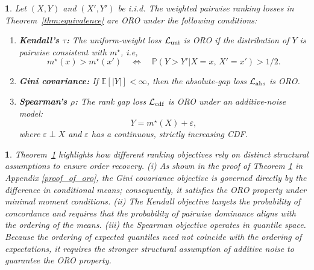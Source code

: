 \documentclass[11pt]{article}
\theoremstyle{plain}
\newtheorem{remark}{\protect\remarkname}
\theoremstyle{plain}
\theoremstyle{plain}
\theoremstyle{plain}
\newtheorem{theorem}{\protect\theoremname}
\theoremstyle{plain}
\theoremstyle{plain}
\theoremstyle{plain}
\providecommand{\remarkname}{Remark}
\providecommand{\theoremname}{Theorem}
\begin{document}
\begin{theorem}
\label{thm:oro_all_three}
Let $(X,Y)$ and $(X',Y')$ be i.i.d. The weighted pairwise ranking losses in Theorem~\ref{thm:equivalence} are ORO under the following conditions:

\begin{enumerate}
    
    \item \textbf{Kendall's $\tau$:} The uniform-weight loss
    $\mathcal{L}_{\textup{uni}}$  is ORO if the distribution of $Y$ is pairwise consistent with  $m^\star$, i.e, 
    \[
    m^\star(x)>m^\star(x') \quad\Longleftrightarrow\quad \mathbb{P}(Y>Y'|X=x,\,X'=x') > 1/2 .
    \]

    \item \textbf{Gini covariance:} 
    If $\mathbb{E}[|Y|] < \infty$, then the absolute-gap loss $\mathcal{L}_{\textup{abs}}$ is ORO. 

    \item \textbf{Spearman's $\rho$:} The rank gap loss
    $\mathcal{L}_{\textup{cdf}}$  is ORO under an additive-noise model:
    \[
    Y=m^\star(X)+\varepsilon,
    \]
    where $\varepsilon \perp X$ and $\varepsilon$ has a continuous, strictly increasing CDF.
\end{enumerate}
\end{theorem}

\begin{remark}
    Theorem~\ref{thm:oro_all_three} highlights how different ranking objectives rely on distinct structural assumptions to ensure order recovery. (i) As shown in the proof of Theorem \ref{thm:oro_all_three} in Appendix \ref{proof_of_oro}, the Gini covariance objective is governed directly by the difference in conditional means; consequently, it satisfies the ORO property under minimal moment conditions. (ii) The Kendall objective targets the probability of concordance and requires that the probability of pairwise dominance aligns with the ordering of the means. (iii) the Spearman objective operates in quantile space. Because the ordering of expected quantiles need not coincide with the ordering of expectations, it requires the stronger structural assumption of additive noise to guarantee the ORO property.
\end{remark} 
\end{document}
